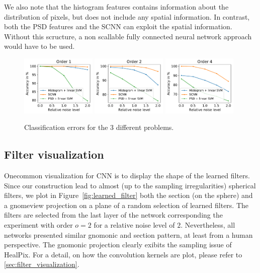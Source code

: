 \documentclass[final,twocolumn,3p,times,authoryear]{elsarticle}
\newcommand{\todo}[1]{{\color[rgb]{.6,.1,.6}{#1}}}
\newcommand{\figref}[1]{Figure~\ref{fig:#1}}
\newcommand{\1}{\b{1}}              %
\newcommand{\0}{\b{0}}              %
\begin{document}
We also note that the histogram features contains information about the
distribution of pixels, but does not include any spatial information. In
contrast, both the PSD features and the SCNN can exploit the spatial
information. Without this scructure, a non scallable fully connected neural network approach would have to be used.



\begin{figure}[!ht]
\centering
\includegraphics[width=0.32\textwidth]{figures/result_order1.pdf}
\includegraphics[width=0.32\textwidth]{figures/result_order2.pdf}
\includegraphics[width=0.32\textwidth]{figures/result_order4.pdf}
\caption{Classification errors for the 3 different problems.}
\label{fig:results}
\end{figure}


\subsection{Filter visualization} 
Onecommon visualization for CNN is to display the shape of the learned filters.
Since our construction lead to almost (up to the sampling irregularities)
spherical filters, we plot in \figref{learned_filter} both the section (on the
sphere) and a gnomeview projection on a plane of a random selection of learned
filters. The filters are selected from the last layer of the network
corresponding the experiment with order $o=2$ for a relative noise level of
$2$. Nevertheless, all networks presented similar gnomonic and section pattern, at least from a
human perspective. The gnomonic projection clearly exibits the sampling issue
of HealPix. For a detail, on how the convolution kernels are plot, please refer to
\ref{sec:filter_visualization}. 
\todo{Tomek: can you say something about the filters.}
\end{document}

